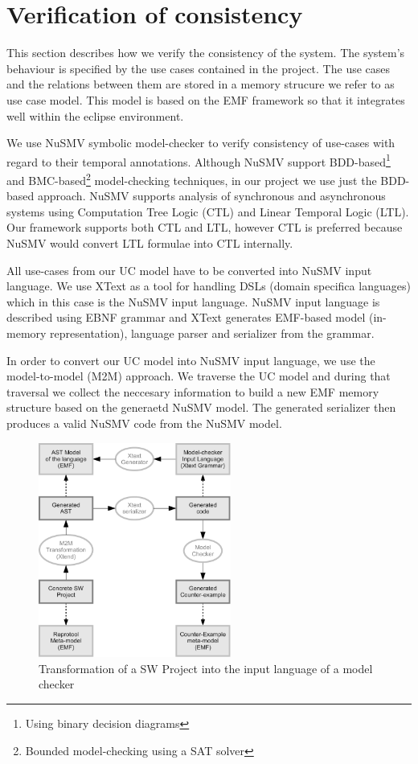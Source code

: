 \section{Verification of consistency}
This section describes how we verify the consistency of the system. The system's behaviour is specified by the use cases contained
in the project. The use cases and the relations between them are stored in a memory strucure we refer to as use case model.
This model is based on the EMF framework so that it integrates well within the eclipse environment.

We use NuSMV symbolic model-checker to verify consistency of use-cases with regard to their temporal annotations.
Although NuSMV support BDD-based\footnote{Using binary decision diagrams} and BMC-based\footnote{Bounded model-checking using a SAT solver} model-checking techniques, in our project we use just the BDD-based approach.
NuSMV supports analysis of synchronous and asynchronous systems using Computation Tree Logic (CTL) and Linear Temporal Logic (LTL).
Our framework supports both CTL and LTL, however CTL is preferred because NuSMV would convert LTL formulae into CTL internally.

All use-cases from our UC model have to be converted into NuSMV input language.
We use XText as a tool for handling DSLs (domain specifica languages) which in this case is the NuSMV input language.
NuSMV input language is described using EBNF grammar and XText generates EMF-based model (in-memory representation), language parser and serializer from the grammar.

In order to convert our UC model into NuSMV input language, we use the model-to-model (M2M) approach.
We traverse the UC model and during that traversal we collect the neccesary information to build a new EMF memory structure based on the generaetd NuSMV model.
The generated serializer then produces a valid NuSMV code from the NuSMV model.

\begin{figure}[h]
  \centering
  \includegraphics[height=200pt]{images/XtextWorkflow}
  \caption{Transformation of a SW Project into the input language of a model checker}
  \label{fig:XtextWorkflow}
\end{figure}
\pagebreak

